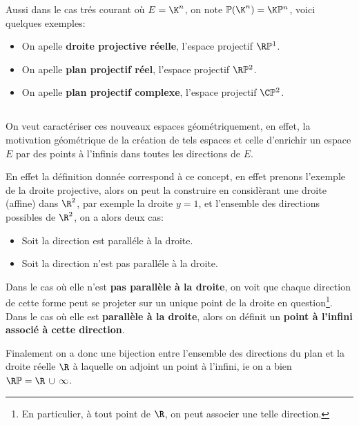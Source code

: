 \documentclass{report}
\begin{document}
   Aussi dans le cas trés courant où \(E = \K^n\), on note \(\mathbb{P}(\K^n) = \K \mathbb{P}^n\), voici quelques exemples:
   \begin{itemize}
      \item On apelle \textbf{droite projective réelle}, l'espace projectif \(\R\mathbb{P}^1\).
      \item On apelle \textbf{plan projectif réel}, l'espace projectif \(\R\mathbb{P}^2\).
      \item On apelle \textbf{plan projectif complexe}, l'espace projectif \(\C\mathbb{P}^2\).
   \end{itemize}
   
   \subsection*{}
   On veut caractériser ces nouveaux espaces géométriquement, en effet, la motivation géométrique de la création de tels espaces et celle d'enrichir un espace \(E\) par des points à l'infinis dans toutes les directions de \(E\).\<
   
   En effet la définition donnée correspond à ce concept, en effet prenons l'exemple de la droite projective, alors on peut la construire en considèrant une droite (affine) dans \(\R^2\), par exemple la droite \(y = 1\), et l'ensemble des directions possibles de \(\R^2\), on a alors deux cas:
   \begin{itemize}
      \item Soit la direction est paralléle à la droite.
      \item Soit la direction n'est pas paralléle à la droite.
   \end{itemize}
   Dans le cas où elle n'est \textbf{pas parallèle à la droite}, on voit que chaque direction de cette forme peut se projeter sur un unique point de la droite en question\footnote[3]{En particulier, à tout point de \(\R\), on peut associer une telle direction.}.\+
   Dans le cas où elle est \textbf{parallèle à la droite}, alors on définit un \textbf{point à l'infini associé à cette direction}.\<

   Finalement on a donc une bijection entre l'ensemble des directions du plan et la droite réelle \(\R\) à laquelle on adjoint un point à l'infini, ie on a bien \(\R\mathbb{P} = \R \, \cup \, \infty\).
   \pagebreak
   
\end{document}
